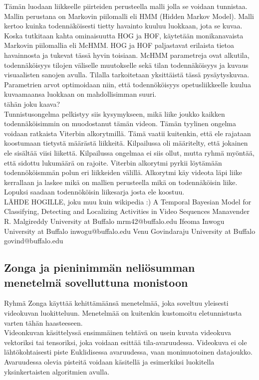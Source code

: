 Tämän luodaan liikkeelle piirteiden perusteella malli jolla se voidaan tunnistaa. Mallin perustana on Markovin piilomalli eli HMM (Hidden Markov Model).
Malli kertoo kuinka todennäköisesti tietty havainto kuuluu luokkaan, jota se kuvaa. Koska tutkitaan kahta ominaisuutta HOG ja HOF,
käytetään monikanavaista Markovin piilomallia eli McHMM. HOG ja HOF paljastavat erilaista tietoa havainnosta ja tukevat tässä hyvin toisiaan.
McHMM parametreja ovat alkutila, todennäköisyys tilojen väliselle muutokselle sekä tilan todennäköisyys ja kuvaus visuaalisten sanojen avulla. Tilalla tarkoitetaan
yksittäistä tässä pysäytyskuvaa. Parametrien arvot optimoidaan niin, että todennököisyys opetusliikkeelle kuulua kuvaamaansa luokkaan on mahdollisimman suuri.\\
tähän joku kaava? \\

Tunnistusongelma pelkistyy siis kysymykseen, mikä liike joukko kaikken todennäköisimmin on muodostanut tämän videon.
Tämän tyylinen ongelma voidaan ratkaista Viterbin alkorytmillä. Tämä vaatii kuitenkin, että ele rajataan koostumaan tietystä määrästä liikkeitä.
Kilpailussa oli määritelty, että jokainen ele sisältää viisi liikettä. Kilpailussa ongelmaa ei siis ollut, mutta ryhmä myöntää, että sidottu lukumäärä on rajoite.
Viterbin alkorytmi pyrkii löytämään todennököismmän polun eri liikkeiden välillä. Alkorytmi käy videota läpi liike kerrallaan ja laskee mikä
on mallien perusteella mikä on todennäköisin liike. Lopuksi saadaan todennököisin liikesarja josta ele koostuu.\\

LÄHDE HOGILLE, joku muu kuin wikipedia :)
A Temporal Bayesian Model for Classifying, Detecting and Localizing Activities
in Video Sequences
Manavender R. Malgireddy
University at Buffalo
mrm42@buffalo.edu
Ifeoma Inwogu
University at Buffalo
inwogu@buffalo.edu
Venu Govindaraju
University at Buffalo
govind@buffalo.edu

\subsection{Zonga ja pieninimmän neliösumman menetelmä sovelluttuna monistoon}
Ryhmä Zonga käyttää kehittämäänsä menetelmää, joka soveltuu yleisesti videokuvan luokitteluun. 
Menetelmää on kuitenkin kustomoitu eletunnistusta varten tähän haasteeseen.\\

Videonkuvan käsittelyssä ensimmäinen tehtävä on usein kuvata videokuva vektoriksi tai tensoriksi, joka voidaan esittää tila-avaruudessa. 
Videokuva ei ole lähtökohtaisesti piste Euklidisessa avaruudessa, vaan monimuotoinen datajoukko. Avaruudessa olevia pisteitä voidaan käsitellä
ja esimerkiksi luokitella yksinkertaisten algoritmien avulla.\\

